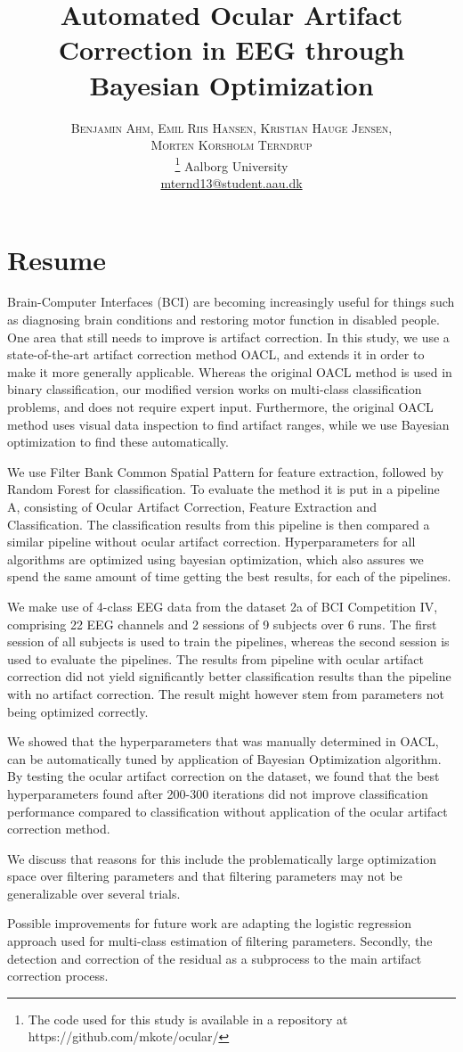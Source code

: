 \documentclass[twoside]{article}
\title{\vspace{-15mm}\fontsize{24pt}{10pt}\selectfont\textbf{Automated Ocular Artifact Correction in EEG through Bayesian Optimization}} %
\author{
\large
\textsc{Benjamin Ahm, } %
\textsc{Emil Riis Hansen, }
\textsc{Kristian Hauge Jensen, }\\
\textsc{Morten Korsholm Terndrup}\\[2mm]\footnote{The code used for this study is available in a repository at https://github.com/mkote/ocular/}
\normalsize Aalborg University \\ %
\normalsize \href{mailto:mternd13@student.aau.dk}{mternd13@student.aau.dk} %
\vspace{-5mm}
}
\date{}
\begin{document}
\section*{Resume}
\begin{Large}
Brain-Computer Interfaces (BCI) are becoming increasingly useful for things such as diagnosing brain conditions and restoring motor function in disabled people. One area that still needs to improve is artifact correction. In this study, we use a state-of-the-art artifact correction method OACL, and extends it in order to make it more generally applicable. Whereas the original OACL method is used in binary classification, our modified version works on multi-class classification problems, and does not require expert input. Furthermore, the original OACL method uses visual data inspection to find artifact ranges, while we use Bayesian optimization to find these automatically.

We use Filter Bank Common Spatial Pattern for feature extraction, followed by Random Forest for classification. To evaluate the method it is put in a pipeline A, consisting of Ocular Artifact Correction, Feature Extraction and Classification. The classification results from this pipeline is then compared a similar pipeline without ocular artifact correction. Hyperparameters for all algorithms are optimized using bayesian optimization, which also assures we spend the same amount of time getting the best results, for each of the pipelines.

We make use of 4-class EEG data from the dataset 2a of BCI Competition IV, comprising 22 EEG channels and 2 sessions of 9 subjects over 6 runs. The first session of all subjects is used to train the pipelines, whereas the second session is used to evaluate the pipelines. The results from pipeline with ocular artifact correction did not yield significantly better classification results than the pipeline with no artifact correction. The result might however stem from parameters not being optimized correctly.

We showed that the hyperparameters that was manually determined in OACL, can be automatically tuned by application of Bayesian Optimization algorithm. By testing the ocular artifact correction on the dataset, we found that the best hyperparameters found after 200-300 iterations did not improve classification performance compared to classification without application of the ocular artifact correction method. 

We discuss that reasons for this include the problematically large optimization space over filtering parameters and that filtering parameters may not be generalizable over several trials.

Possible improvements for future work are adapting the logistic regression approach used for multi-class estimation of filtering parameters. Secondly, the detection and correction of the residual as a subprocess to the main artifact correction process.
\end{Large}
\end{document}
